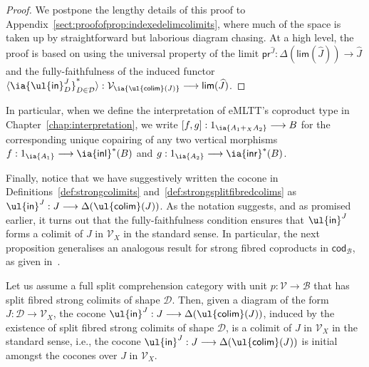 \begin{proof}
We postpone the lengthy details of this proof to Appendix~\ref{sect:proofofprop:indexedelimcolimits}, where  
much of the space is taken up by straightforward but laborious diagram chasing.
At a high level, the proof is based on using the universal property of the limit $\mathsf{pr}^{\widehat{J}} : \Delta(\mathsf{lim}(\widehat{J})) \longrightarrow \widehat{J}$ and the fully-faithfulness of the induced functor $\langle \ia {\mathsf{\ul{in}}^J_D}^*_{D \in \mathcal{D}} \rangle : \mathcal{V}_{\ia {\mathsf{\ul{colim}}(J)}} \longrightarrow \mathsf{lim}(\widehat{J})$. 
\end{proof}

In particular, when we define the interpretation of eMLTT's coproduct type in Chapter~\ref{chap:interpretation}, we write $[f,g] : 1_{\ia {A_1 +_X A_2}} \longrightarrow B$ for the corresponding unique copairing of any two vertical morphisms  $f : 1_{\ia {A_1}} \longrightarrow \ia {\mathsf{inl}} ^*(B)$ and $g : 1_{\ia {A_2}} \longrightarrow \ia {\mathsf{inr}} ^*(B)$. 


Finally, notice that we have suggestively written the cocone in Definitions~\ref{def:strongcolimits} and~\ref{def:strongsplitfibredcolims} as $\mathsf{\ul{in}}^{J} : J \longrightarrow \Delta(\mathsf{\ul{colim}}(J))$.
As the notation suggests, and as promised earlier, it turns out that the fully-faithfulness condition ensures 
that $\mathsf{\ul{in}}^{J}$ forms a colimit of $J$ in $\mathcal{V}_X$ in the standard sense.
%
In particular, the next proposition generalises an analogous result for strong fibred coproducts in $\mathsf{cod}_\mathcal{B}$, as given in~\cite[Exercise~10.5.6 (ii)]{Jacobs:Book}.

\begin{proposition}
\label{prop:fibredcolimits}
Let us assume a full split comprehension category with unit \linebreak $p : \mathcal{V} \longrightarrow \mathcal{B}$ that has split fibred strong colimits of shape $\mathcal{D}$. Then, given a diagram of the form $J : \mathcal{D} \longrightarrow \mathcal{V}_X$, the cocone $\mathsf{\ul{in}}^{J} : J \longrightarrow \Delta(\mathsf{\ul{colim}}(J))$, induced by the existence of split fibred strong colimits of shape $\mathcal{D}$, is a colimit of $J$ in $\mathcal{V}_X$ in the standard sense, i.e., the cocone $\mathsf{\ul{in}}^{J} : J \longrightarrow \Delta(\mathsf{\ul{colim}}(J))$ is initial amongst the cocones over $J$ in $\mathcal{V}_X$.
\end{proposition}

